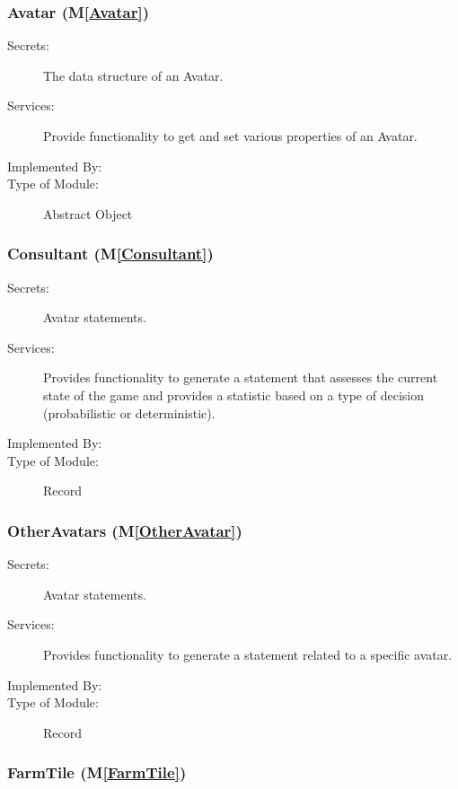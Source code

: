 \documentclass[12pt, titlepage]{article}
\newcommand{\mref}[1]{M\ref{#1}}
\begin{document}
\subsubsection{Avatar (\mref{Avatar})}

\begin{description}
\item[Secrets:] The data structure of an Avatar.
\item[Services:] Provide functionality to get and set various properties of an Avatar.
\item[Implemented By:]  \progname
\item[Type of Module:] Abstract Object
\end{description}

\subsubsection{Consultant (\mref{Consultant})}

\begin{description}
\item[Secrets:] Avatar statements.
\item[Services:] Provides functionality to generate a statement that assesses the current state of the game and provides a statistic based on a type of decision (probabilistic or deterministic).
\item[Implemented By:]  \progname
\item[Type of Module:] Record
\end{description}

\subsubsection{OtherAvatars (\mref{OtherAvatar})}

\begin{description}
\item[Secrets:] Avatar statements.
\item[Services:] Provides functionality to generate a statement related to a specific avatar.
\item[Implemented By:]  \progname
\item[Type of Module:] Record
\end{description}


\subsubsection{FarmTile (\mref{FarmTile})}
\end{document}
